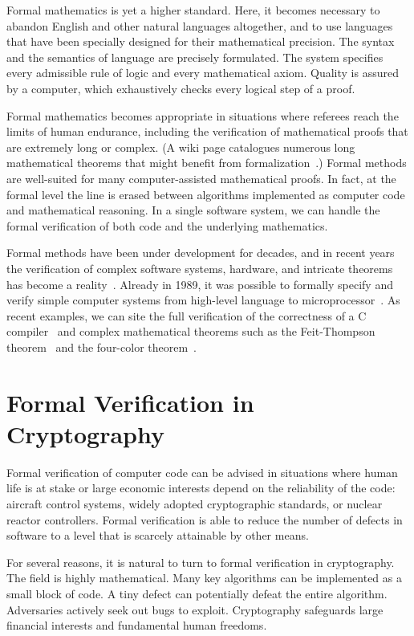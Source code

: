 \documentclass[11pt]{amsart} %
\begin{document}
Formal mathematics is yet a higher standard.   Here,
it becomes necessary to abandon English and other natural languages altogether, 
and to use languages that have been specially designed for their mathematical
precision. The syntax and the semantics of language are precisely formulated.
The system specifies
every admissible rule of logic and  every mathematical axiom.  
Quality is assured by a computer, which exhaustively checks every logical step of a proof.

Formal mathematics becomes appropriate in situations where referees
reach the limits of human endurance, including the verification of mathematical proofs that are extremely
 long or  complex. (A wiki page catalogues numerous long mathematical theorems that might benefit
from formalization~\cite{WikiLong}.)  
Formal methods are well-suited for many computer-assisted mathematical proofs.  
In fact, at the formal level the line is erased between algorithms implemented as computer code
and mathematical reasoning.  In a single software system, 
we can handle  the formal verification of both code and the underlying mathematics.

Formal methods have been under development for decades, and in recent years the verification
of complex software systems, hardware, and intricate theorems has become a reality~\cite{FVI}.  
Already in 1989, it was possible to formally specify and verify simple computer systems from high-level language
to microprocessor~\cite{BHMY}.  As recent examples, 
we can site the full
verification of the correctness of a C compiler~\cite{CC-Web}
and complex mathematical theorems such as the Feit-Thompson theorem~\cite{OOT-13} and the four-color theorem~\cite{gonthier:2008:formal}.


\section{Formal Verification in Cryptography}

Formal verification of computer code can be advised in
situations where human life is at stake or large economic interests depend on the reliability of the code:
aircraft control systems, widely adopted cryptographic standards, or nuclear reactor controllers.
Formal verification is able to reduce the number of defects in software to a level that is
scarcely attainable by other means.

For several reasons, it is natural to turn to formal verification in cryptography.
The field is highly mathematical.  Many key algorithms can be implemented as
a small block of code.  A tiny defect can potentially defeat the entire algorithm.
Adversaries actively seek out bugs to exploit.
Cryptography safeguards
large financial interests and fundamental human freedoms.
\end{document}
